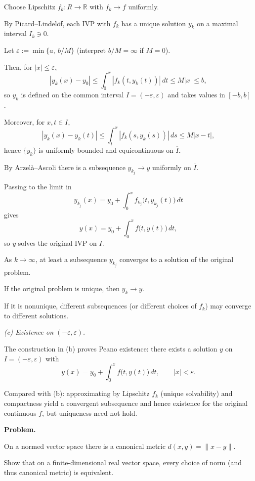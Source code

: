 \documentclass[12pt,a4paper]{article}
\begin{document}
Choose Lipschitz $f_k:R\to\mathbb R$ with $f_k\to f$ uniformly.

By Picard--Lindel\"of, each IVP with $f_k$ has a unique solution $y_k$ on a maximal interval $I_k\ni0$.

\medskip

Let $\varepsilon:=\min\{a,\ b/M\}$ (interpret $b/M=\infty$ if $M=0$).

Then, for $|x|\le\varepsilon$,
\[
|y_k(x)-y_0|\le \int_0^x |f_k(t,y_k(t))|\,dt \le M|x|\le b,
\]
so $y_k$ is defined on the common interval $I=(-\varepsilon,\varepsilon)$ and takes values in $[-b,b]$.

\medskip

Moreover, for $x,t\in I$,
\[
|y_k(x)-y_k(t)|\le \int_t^x |f_k(s,y_k(s))|\,ds \le M|x-t|,
\]
hence $\{y_k\}$ is uniformly bounded and equicontinuous on $\overline I$.

\medskip

By Arzel\`a--Ascoli there is a subsequence $y_{k_j}\to y$ uniformly on $\overline I$.

Passing to the limit in
\[
y_{k_j}(x)=y_0+\int_0^x f_{k_j}\big(t,y_{k_j}(t)\big)\,dt
\]
gives
\[
y(x)=y_0+\int_0^x f\big(t,y(t)\big)\,dt,
\]
so $y$ solves the original IVP on $I$.

\medskip

As $k\to\infty$, at least a subsequence $y_{k_j}$ converges to a solution of the original problem.

If the original problem is unique, then $y_k\to y$.

If it is nonunique, different subsequences (or different choices of $f_k$) may converge to different solutions.

\medskip

\emph{(c) Existence on $(-\varepsilon,\varepsilon)$.}

The construction in (b) proves Peano existence: there exists a solution
$y$ on $I=(-\varepsilon,\varepsilon)$ with
\[
y(x)=y_0+\int_0^x f\big(t,y(t)\big)\,dt,\qquad |x|<\varepsilon.
\]

Compared with (b): approximating by Lipschitz $f_k$ (unique solvability) and compactness
yield a convergent subsequence and hence existence for the original continuous $f$,
but uniqueness need not hold.

\textbf{Problem.}

On a normed vector space there is a canonical metric
$d(x,y)=\|x-y\|$.

Show that on a finite-dimensional real vector space, every choice of norm (and thus canonical metric) is equivalent.
\end{document}
